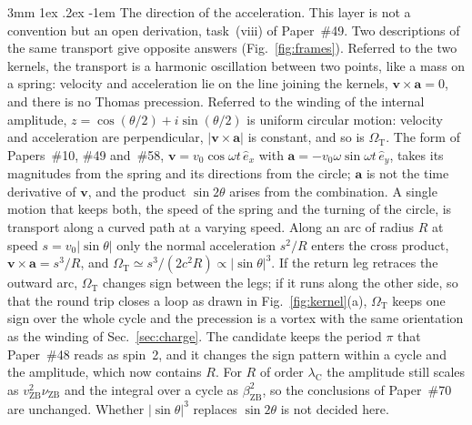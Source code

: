 \documentclass[%
 reprint, amsmath,amssymb, aps, prb, ]{revtex4-2}
\makeatletter
\numberwithin{equation}{section}
\renewcommand\paragraph{%
  \@startsection{paragraph}{4}{\z@}%
    {3mm \@plus 1ex \@minus .2ex}%
    {-1em}%
    {\normalfont\normalsize\itshape}}
\newcommand{\vZB}{v_{\text{ZB}}}
\newcommand{\betaZB}{\beta_{\text{ZB}}}
\newcommand{\lambdaC}{\lambda_{\text{C}}}
\newcommand{\nuZB}{\nu_{\text{ZB}}}
\newcommand{\OmT}{\Omega_{\text{T}}}
\makeatother
\begin{document}
\paragraph{The direction of the acceleration.} This layer is not a convention but an open derivation, task~(viii) of Paper~\#49. Two descriptions of the same transport give opposite answers (Fig.~\ref{fig:frames}). Referred to the two kernels, the transport is a harmonic oscillation between two points, like a mass on a spring: velocity and acceleration lie on the line joining the kernels, $\mathbf v\times\mathbf a = 0$, and there is no Thomas precession. Referred to the winding of the internal amplitude, $z = \cos(\theta/2) + i\sin(\theta/2)$ is uniform circular motion: velocity and acceleration are perpendicular, $|\mathbf v\times\mathbf a|$ is constant, and so is $\OmT$. The form of Papers~\#10, \#49 and~\#58, $\mathbf v = v_0\cos\omega t\,\hat e_x$ with $\mathbf a = -v_0\omega\sin\omega t\,\hat e_y$, takes its magnitudes from the spring and its directions from the circle; $\mathbf a$ is not the time derivative of $\mathbf v$, and the product $\sin2\theta$ arises from the combination. A single motion that keeps both, the speed of the spring and the turning of the circle, is transport along a curved path at a varying speed. Along an arc of radius $R$ at speed $s = v_0|\sin\theta|$ only the normal acceleration $s^{2}/R$ enters the cross product, $\mathbf v\times\mathbf a = s^{3}/R$, and $\OmT\simeq s^{3}/(2c^{2}R)\propto|\sin\theta|^{3}$. If the return leg retraces the outward arc, $\OmT$ changes sign between the legs; if it runs along the other side, so that the round trip closes a loop as drawn in Fig.~\ref{fig:kernel}(a), $\OmT$ keeps one sign over the whole cycle and the precession is a vortex with the same orientation as the winding of Sec.~\ref{sec:charge}. The candidate keeps the period $\pi$ that Paper~\#48 reads as spin~2, and it changes the sign pattern within a cycle and the amplitude, which now contains $R$. For $R$ of order $\lambdaC$ the amplitude still scales as $\vZB^{2}\nuZB$ and the integral over a cycle as $\betaZB^{2}$, so the conclusions of Paper~\#70 are unchanged. Whether $|\sin\theta|^{3}$ replaces $\sin2\theta$ is not decided here.
\end{document}
